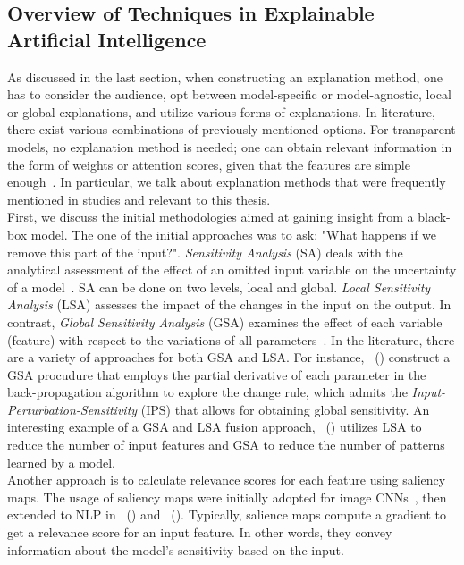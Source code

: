 \subsection{Overview of Techniques in Explainable Artificial Intelligence}
\label{subsec:explainableArtificialIntelligence_Overview}
As discussed in the last section, when constructing an explanation method, one has to consider the audience,
opt between model-specific or model-agnostic, local or global explanations, and utilize various forms of explanations. In literature, there exist various combinations of previously mentioned options. For transparent models, no explanation method is needed; one can obtain relevant information in the form of weights or attention scores, given that the features are simple enough~\parencite{XAIConceptsTaxonomies_Arrieta}. In particular, we talk about explanation methods that were frequently mentioned in studies and relevant to this thesis.\\
First, we discuss the initial methodologies aimed at gaining insight from a black-box model. The one of the initial approaches was to ask: "What happens if we remove this part of the input?". \emph{Sensitivity Analysis} (SA) deals with the analytical assessment of the effect of an omitted input variable on the uncertainty of a model~\parencite{SensitivityAndGeneralizationInNNs_Novak}. SA can be done on two levels, local and global. \emph{Local Sensitivity Analysis} (LSA) assesses the impact of the changes in the input on the output. In contrast, \emph{Global Sensitivity Analysis} (GSA) examines the effect of each variable (feature) with respect to the variations of all parameters~\parencite{InputPerturbationSensitivity_Rao}. In the literature, there are a variety of approaches for both GSA and LSA. For instance,~\citeauthor{SensitivityAndGeneralizationInNNs_Novak} (\citeyear{SensitivityAndGeneralizationInNNs_Novak}) construct a GSA procudure that employs the partial derivative of each parameter in the back-propagation algorithm to explore the change rule, which admits the \emph{Input-Perturbation-Sensitivity} (IPS) that allows for obtaining global sensitivity. An interesting example of a GSA and LSA fusion approach,~\citeauthor{SensitivityAnalysisForPNNs_Kowalski} (\citeyear{SensitivityAnalysisForPNNs_Kowalski}) utilizes LSA to reduce the number of input features and GSA to reduce the number of patterns learned by a model.\\
Another approach is to calculate relevance scores for each feature using saliency maps. The usage of saliency maps were initially adopted for image CNNs~\parencite{DeepInsideCNNs_Simonyan}, then extended to NLP in~\citeauthor{ExtractionOfSalientSentences_Denil} (\citeyear{ExtractionOfSalientSentences_Denil}) and~\citeauthor{AskTheGRU_Trapit} (\citeyear{AskTheGRU_Trapit}). Typically, salience maps compute a gradient to get a relevance score for an input feature. In other words, they convey information about the model's sensitivity based on the input.\\
